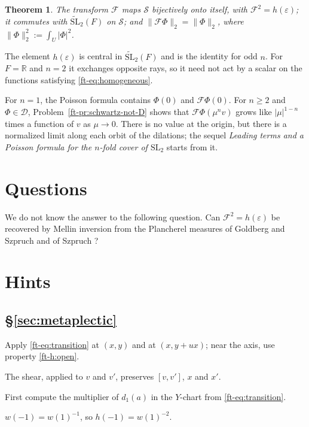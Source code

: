 \documentclass[reqno]{amsart}
\newcommand{\tSL}{\widetilde{\mathrm{SL}}_2}
\newcommand{\Fc}{\mathcal{F}}
\newcommand{\Dc}{\mathcal{D}}
\newcommand{\Sc}{\mathcal{S}}
\numberwithin{equation}{section}
\theoremstyle{definition}
\theoremstyle{plain}
\newtheorem{theorem}{Theorem}[section]
\newenvironment{hints}{\begin{description}[font=\normalfont\bfseries]}{\end{description}}
\begin{document}
\begin{theorem}\label{th:schwartz}
  The transform $\Fc$ maps $\Sc$ bijectively onto itself, with $\Fc^2 = h(\varepsilon)$; it commutes with $\tSL(F)$ on $\Sc$; and $\lVert \Fc \Phi \rVert_2 = \lVert \Phi \rVert_2$, where $\lVert \Phi \rVert_2^2 := \int_U \lvert \Phi \rvert^2$.
\end{theorem}

The element $h(\varepsilon)$ is central in $\tSL(F)$ and is the identity for odd $n$.  For $F = \mathbb{R}$ and $n = 2$ it exchanges opposite rays, so it need not act by a scalar on the functions satisfying \eqref{ft-eq:homogeneous}.

For $n = 1$, the Poisson formula contains $\Phi(0)$ and $\Fc \Phi(0)$.  For $n \geq 2$ and $\Phi \in \Dc$, Problem~\ref{ft-pr:schwartz-not-D} shows that $\Fc \Phi(\mu^n v)$ grows like $\lvert \mu \rvert^{1-n}$ times a function of $v$ as $\mu \to 0$.  There is no value at the origin, but there is a normalized limit along each orbit of the dilations; the sequel \emph{Leading terms and a Poisson formula for the $n$-fold cover of $\mathrm{SL}_2$} starts from it.

\section*{Questions}

We do not know the answer to the following question.  Can $\Fc^2 = h(\varepsilon)$ be recovered by Mellin inversion from the Plancherel measures of Goldberg and Szpruch \cite{GS} and of Szpruch \cite{Sz}?


\section*{Hints}

\subsection*{\S\ref{sec:metaplectic}}
\begin{hints}
\item[\ref{pr:unip-other-chart}] Apply \eqref{ft-eq:transition} at $(x, y)$ and at $(x, y + u x)$; near the axis, use property \ref{ft-h:open}.
\item[\ref{pr:unip-lines}] The shear, applied to $v$ and $v'$, preserves $[v, v']$, $x$ and $x'$.
\item[\ref{pr:torus-formula}] First compute the multiplier of $d_1(a)$ in the $Y$-chart from \eqref{ft-eq:transition}.
\item[\ref{pr:torus-center}] $w(-1) = w(1)^{-1}$, so $h(-1) = w(1)^{-2}$.
\end{hints}
\end{document}

